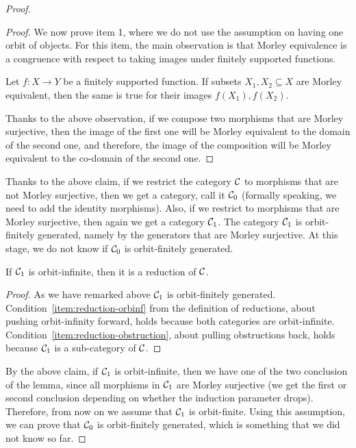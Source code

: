 \begin{proof}
\begin{proof}
We now prove item 1, where we do not use the assumption on having one orbit of objects. For this item, the main observation is that Morley equivalence is a congruence with respect to taking images under finitely supported functions.
\begin{subclaim}
    Let $f : X \to Y$ be a finitely supported function. If subsets $X_1,X_2 \subseteq X$ are Morley equivalent, then the same is true for their images $f(X_1),f(X_2)$.
\end{subclaim}
    Thanks to the above observation, if we compose two morphisms that are Morley surjective, then the image of the first one will be Morley equivalent to the domain of the second one, and therefore, the image of the composition will be Morley equivalent to the co-domain of the second one. 
    \end{proof}

    Thanks to the above claim, if we restrict the category ${\mathcal C}$ to morphisms that are not Morley surjective, then we get a category, call it ${\mathcal C}_0$ (formally speaking, we need to add the identity morphisms). Also, if we restrict to morphisms that are Morley surjective, then again we get a category ${\mathcal C}_1$. The category ${\mathcal C}_1$ is orbit-finitely generated, namely by the generators that are Morley surjective. At this stage, we do not know if ${\mathcal C}_0$ is orbit-finitely generated.  
    
    \begin{claim}
        If ${\mathcal C}_1$ is orbit-infinite, then it is a reduction of ${\mathcal C}$.
    \end{claim}
    \begin{proof}
     As we have remarked above ${\mathcal C}_1$ is orbit-finitely generated. Condition~\ref{item:reduction-orbinf} from  the definition of reductions, about pushing orbit-infinity forward,  holds because both categories are orbit-infinite. Condition~\ref{item:reduction-obstruction}, about pulling obstructions back, holds because ${\mathcal C}_1$ is a sub-category of ${\mathcal C}$.    
    \end{proof}

    By the above claim, if ${\mathcal C}_1$ is orbit-infinite, then we have one of the two conclusion of the lemma, since all morphisms in ${\mathcal C}_1$ are Morley surjective (we get the first or second conclusion depending on whether the induction parameter drops). Therefore, from now on we assume that  ${\mathcal C}_1$ is orbit-finite.  Using this assumption, we can prove that ${\mathcal C}_0$ is orbit-finitely generated, which is something that we did not know so far.


\end{proof}
